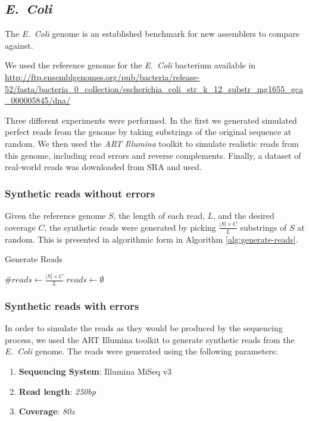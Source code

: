 \subsubsection{\dBHT}

\subsection{\emph{E.~Coli}}

The \emph{E.~Coli} genome is an established benchmark for new assemblers to compare against.

We used the reference genome for the \emph{E.~Coli} bacterium available in \url{http://ftp.ensemblgenomes.org/pub/bacteria/release-52/fasta/bacteria_0_collection/escherichia_coli_str_k_12_substr_mg1655_gca_000005845/dna/}

Three different experiments were performed. In the first we generated simulated perfect reads from the genome by taking substrings of 
the original sequence at random. We then used the \emph{ART Illumina} toolkit  to simulate realistic reads from this
genome, including read errors and reverse complements. Finally, a dataset of real-world reads was downloaded from SRA 
and used.

\subsubsection{Synthetic reads without errors}

Given the reference genome $S$, the length of each read, $L$, and the desired coverage $C$, the synthetic reads were generated by picking
$\frac{|S| \times C}{L}$ substrings of $S$ at random. This is presented in algorithmic form in Algorithm \ref{alg:generate-reads}.

\begin{algorithm}
  \caption{Generate Reads}\label{alg:generate-reads}
  $\mathit{\#reads} \gets \frac{|S| \times C}{L}$\;
  $reads \gets \emptyset$\;
\end{algorithm}

\subsubsection{Synthetic reads with errors}

In order to simulate the reads as they would be produced by the sequencing process, we used the ART Illumina toolkit to generate
synthetic reads from the \emph{E.~Coli} genome. The reads were generated using the following parameters:

\begin{enumerate}
\item \textbf{Sequencing System}: Illumina MiSeq v3
\item \textbf{Read length}: \textit{250bp}
\item \textbf{Coverage}: \textit{80x}
\end{enumerate}